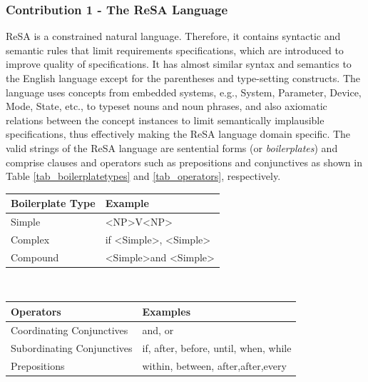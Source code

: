 \subsubsection{Contribution 1 - The ReSA Language}
ReSA \cite{Mahmud2015ReSA:Systems} is a constrained natural language. Therefore, it contains syntactic and semantic rules that limit requirements specifications, which are introduced to improve quality of specifications. It has almost similar syntax and semantics to the English language except for the parentheses and type-setting constructs. The language uses concepts from embedded systems, e.g., System, Parameter, Device, Mode, State, etc., to typeset nouns and noun phrases, and also axiomatic relations between the concept instances to limit semantically implausible specifications, thus effectively making the ReSA language domain specific. The valid strings of the ReSA language are sentential forms (or \textit{boilerplates}) and comprise clauses and operators such as prepositions and conjunctives as shown in Table \ref{tab_boilerplatetypes} and \ref{tab_operators}, respectively.
\begin{center}
\raggedright
\begin{minipage}[b]{0.4\textwidth}
\begin{tabular}{|l|l|}
\hline  \rowcolor{gray!10}
Boilerplate Type & Example                                                             \\ \hline 
Simple           & \textless{}NP\textgreater{}V\textless{}NP\textgreater{}             \\ \hline
Complex          & if \textless{}Simple\textgreater{}, \textless{}Simple\textgreater{} \\ \hline
Compound         & \textless{}Simple\textgreater and \textless{}Simple\textgreater{}   \\ \hline         
\end{tabular}
 \label{tab_boilerplatetypes} 
\end{minipage}~
\begin{minipage}[b]{0.4\textwidth}
\begin{tabular}{|l|l|}
\hline   \rowcolor{gray!10}
Operators & Examples													\\ \hline 
Coordinating Conjunctives        & and, or					\\ \hline
Subordinating Conjunctives       & if, after, before, until, when, while			\\ \hline
Prepositions        			 & within, between, after,after,every 	\\ \hline
\end{tabular}
 \label{tab_operators} 
\end{minipage}  
\end{center}

